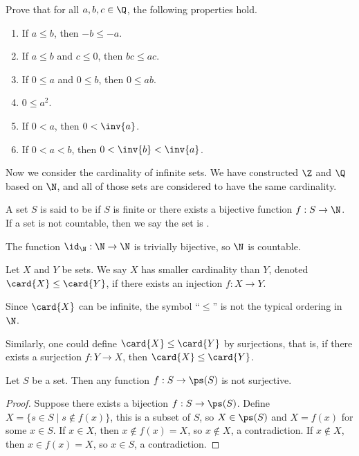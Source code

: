 \documentclass[10pt]{article}
\begin{document}
\begin{problem}
    Prove that for all $a,b,c\in\Q$, the following properties hold.
    \begin{enumerate}
        \item If $a\le b$, then $-b\le -a$.
        \item If $a\le b$ and $c\le 0$, then $bc\le ac$.
        \item If $0\le a$ and $0\le b$, then $0\le ab$.
        \item $0\le{a}^{2}$.
        \item If $0<a$, then $0<\inv{a}$.
        \item If $0<a<b$, then $0<\inv{b}<\inv{a}$.
    \end{enumerate}
\end{problem}
\par
Now we consider the cardinality of infinite sets. We have constructed $\Z$ and $\Q$ based on $\N$, and all of those sets are considered to have the same cardinality.
\begin{definition}
    A set $S$ is said to be  if $S$ is finite or there exists a bijective function $f:S\to\N$. If a set is not countable, then we say the set is .
\end{definition}
\par
The function ${\id}_{\N}:\N\to\N$ is trivially bijective, so $\N$ is countable.
\begin{definition}
    Let $X$ and $Y$ be sets. We say $X$ has smaller cardinality than $Y$, denoted $\card{X}\le\card{Y}$, if there exists an injection $f:X\to Y$.
\end{definition}
\begin{remark}
    Since $\card{X}$ can be infinite, the symbol ``$\le$'' is not the typical ordering in $\N$.
\end{remark}
\par
Similarly, one could define $\card{X}\le\card{Y}$ by surjections, that is, if there exists a surjection $f:Y\to X$, then $\card{X}\le\card{Y}$.
\begin{theorem}
    Let $S$ be a set. Then any function $f:S\to\ps(S)$ is not surjective.
\end{theorem}
\begin{proof}
    Suppose there exists a bijection $f:S\to\ps(S)$. Define $X=\{s\in S\mid s\notin f(x)\}$, this is a subset of $S$, so $X\in\ps(S)$ and $X=f(x)$ for some $x\in S$. If $x\in X$, then $x\notin f(x)=X$, so $x\notin X$, a contradiction. If $x\notin X$, then $x\in f(x)=X$, so $x\in S$, a contradiction.
\end{proof}
\end{document}
